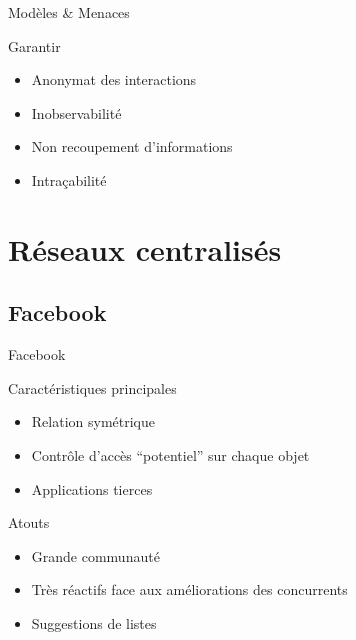 \begin{frame}{Modèles \& Menaces}
\begin{block}{Garantir}
\begin{itemize}
\item Anonymat des interactions
\item Inobservabilité
\item Non recoupement d'informations
\item Intraçabilité
\end{itemize}
\end{block}
	
\end{frame}
\section{Réseaux centralisés}

\subsection{Facebook}
\begin{frame}{Facebook}

\begin{block}{Caractéristiques principales}
\begin{itemize}
\item Relation symétrique
\item Contrôle d'accès ``potentiel'' sur chaque objet
\item Applications tierces
\end{itemize}
\end{block}

\begin{block}{Atouts}
\begin{itemize}
\item Grande communauté
\item Très réactifs face aux améliorations des concurrents
\item Suggestions de listes
\end{itemize}
\end{block}

\end{frame}

